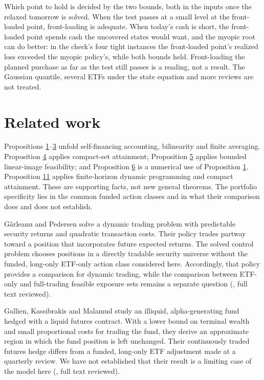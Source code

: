 \documentclass[11pt]{article}
\begin{document}
Which point to hold is decided by the two bounds, both in the inputs
once the relaxed tomorrow is solved. When the test passes at a small
level at the front-loaded point, front-loading is adequate. When
today's cash is short, the front-loaded point spends cash the uncovered
states would want, and the myopic root can do better: in the check's
four tight instances the front-loaded point's realized loss exceeded
the myopic policy's, while both bounds held. Front-loading the planned
purchase as far as the test still passes is a reading, not a result.
The Gaussian quantile, several ETFs under the state equation and more
reviews are not treated.

\section{Related work}\label{sec:4}

Propositions \hyperref[res:Proposition-1]{1}--\hyperref[res:Proposition-3]{3} unfold self-financing accounting, bilinearity and
finite averaging. Proposition \hyperref[res:Proposition-4]{4} applies compact-set attainment;
Proposition \hyperref[res:Proposition-5]{5} applies bounded linear-image feasibility; and
Proposition \hyperref[res:Proposition-6]{6} is a numerical use of Proposition \hyperref[res:Proposition-1]{1}. Proposition \hyperref[res:Proposition-11]{11}
applies finite-horizon dynamic programming and compact attainment.
These are supporting facts, not new general theorems. The portfolio
specificity lies in the common funded action classes and in what
their comparison does and does not establish.

Gârleanu and Pedersen solve a dynamic trading problem with predictable security returns and
quadratic transaction costs. Their policy trades partway toward a position that incorporates
future expected returns. The solved control problem chooses positions in a directly tradable
security universe without the funded, long-only ETF-only action class considered here.
Accordingly, that policy provides a comparison for dynamic trading, while the comparison
between ETF-only and full-trading feasible exposure sets remains a separate question
(\cite{garleanu2009dynamic}, full text reviewed).

Gallien, Kassibrakis and Malamud study an illiquid, alpha-generating fund hedged with a
liquid futures contract. With a lower bound on terminal wealth and small proportional costs
for trading the fund, they derive an approximate region in which the fund position is left
unchanged. Their continuously traded futures hedge differs from a funded, long-only ETF
adjustment made at a quarterly review. We have not established that their result is a
limiting case of the model here (\cite{gallien2018hedge}, full text reviewed).
\end{document}
